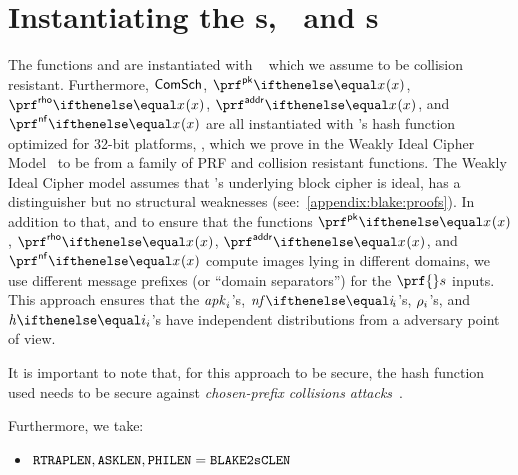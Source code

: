 
\section{Instantiating the \prf{}s, \comm~and \crh{}s}\label{instantiation:prf-comm-crh}


The functions \crhhsig{} and \crhots{} are instantiated with ~\cite{fips1804} which we assume to be collision resistant. Furthermore, $\mathsf{ComSch}$, $\prfpk{}{x}$, $\prfrho{}{x}$, $\prfaddr{}{x}$, and $\prfnf{}{x}$ are all instantiated with 's hash function optimized for 32-bit platforms, , which we prove in the Weakly Ideal Cipher Model~\cite{luykx2016security} to be from a family of PRF and collision resistant functions. The Weakly Ideal Cipher model assumes that 's underlying block cipher is ideal, has a distinguisher but no structural weaknesses (see:~\ref{appendix:blake:proofs}). In addition to that, and to ensure that the functions $\prfpk{}{x}$, $\prfrho{}{x}$, $\prfaddr{}{x}$, and $\prfnf{}{x}$ compute images lying in different domains, we use different message prefixes (or ``domain separators'') for the $\prf{}s$ inputs. This approach ensures that the $\mathit{apk}_{i}$'s, $\nf{i}$'s, $\mathit{\rho}_{i}$'s, and $\htag{i}$'s have independent distributions from a \ppt{} adversary point of view.

\begin{notebox}
    It is important to note that, for this approach to be secure, the hash function used needs to be secure against \emph{chosen-prefix collisions attacks}~\cite{md5-collision}.
\end{notebox}

Furthermore, we take:
\begin{itemize}
    \item $\mathtt{RTRAPLEN}, \mathtt{ASKLEN}, \mathtt{PHILEN} = \mathtt{BLAKE2sCLEN}$
\end{itemize}

